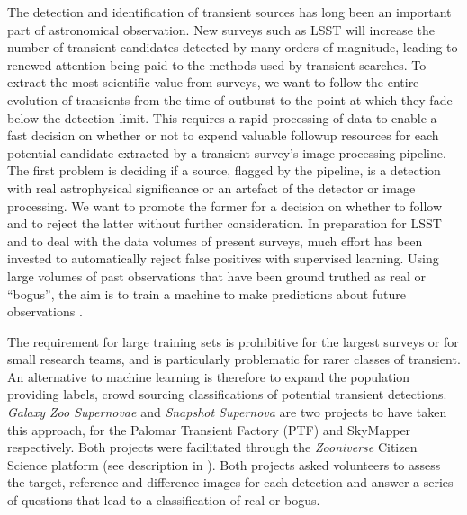 \documentclass[a4paper,fleqn,usenatbib]{mnras}
\begin{document}
The detection and identification of transient sources has long been an important part of astronomical observation. New surveys such as LSST \citep{Ivezic08} will increase the number of transient candidates detected by many orders of magnitude, leading to renewed attention being paid to the methods used by transient searches.  To extract the most scientific value from surveys, we want to follow the entire evolution of transients from the time of outburst to the point at which they fade below the detection limit.  This requires a rapid processing of data to enable a fast decision on whether or not to expend valuable followup resources for each potential candidate extracted by a transient survey's image processing pipeline.  The first problem is deciding if a source, flagged by the pipeline, is a detection with real astrophysical significance or an artefact of the detector or image processing.  We want to promote the former for a decision on whether to follow and to reject the latter without further consideration.  In preparation for LSST and to deal with the data volumes of present surveys, much effort has been invested to automatically reject false positives with supervised learning. Using large volumes of past observations that have been ground truthed as real or ``bogus'', the aim is to train a machine to make predictions about future observations \citep{Bloom12, Brink13, Goldstein15, duBuisson15, Donalek08, Romano06, Bailey07}.



The requirement for large training sets is prohibitive for the largest surveys or for small research teams, and is particularly problematic for rarer classes of transient.  An alternative to machine learning is therefore to expand the population providing labels, crowd sourcing classifications of potential transient detections.  \textit{Galaxy Zoo Supernovae} \citep{Smith11} and \textit{Snapshot Supernova} \citep{Campbell15} are two projects to have taken this approach, for the Palomar Transient Factory (PTF) \citep{Rau09, Law09} and SkyMapper respectively.  Both projects were facilitated through the \textit{Zooniverse} Citizen Science platform (see description in \citet{Marshall15}).  Both projects asked volunteers to assess the target, reference and difference images for each detection and answer a series of questions that lead to a classification of real or bogus.  
\end{document}
